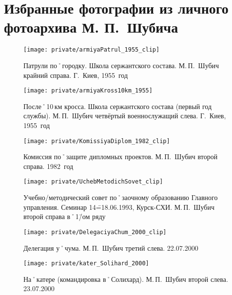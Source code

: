 ﻿\section[Избранные фотографии из фотоархива М. П.~Шубича]{Избранные фотографии из личного фотоархива М. П.~Шубича}

\makeatletter
\setlength{\@fptop}{0pt}
\makeatother

\begin{figure}[H]
\texttt{[image: private/armiyaPatrul\_1955\_clip]}
\caption{Патрули по˚городку. Школа сержантского состава. М.\,П.~Шубич крайний справа. Г.~Киев, 1955~год}
\label{fig:armiyaPatrul_1955}
\end{figure}

\begin{figure}[h]
\texttt{[image: private/armiyaKross10km\_1955]}
\caption{После˚10\,км кросса. Школа сержантского состава (первый год службы). М.\,П.~Шубич четвёртый военнослужащий слева. Г.~Киев, 1955~год}
\label{fig:armiyaKross10km_1955}
\end{figure}

\begin{figure}[h]
\texttt{[image: private/KomissiyaDiplom\_1982\_clip]}
\caption{Комиссия по˚защите дипломных проектов. М.\,П.~Шубич второй справа. 1982~год}
\label{fig:KomissiyaDiplom_1982}
\end{figure}

\begin{figure}[h]
\texttt{[image: private/UchebMetodichSovet\_clip]}
\caption{Учебно\-/методический совет по˚заочному образованию Главного управления. Семинар 14\==18.06.1993, Курск-СХИ. М.\,П.~Шубич второй справа в˚1\=/ом ряду}
\label{fig:UchebMetodichSovet}
\end{figure}

\begin{figure}[h]
\texttt{[image: private/DelegaciyaChum\_2000\_clip]}
\caption{Делегация у˚чума. М.\,П.~Шубич третий слева. 22.07.2000}
\label{fig:DelegaciyaChum_2000}
\end{figure}

\begin{figure}[h]
\texttt{[image: private/kater\_Solihard\_2000]}
\caption{На˚катере (командировка в˚Солихард). М.\,П.~Шубич второй слева. 23.07.2000}
\label{fig:kater_Solihard_2000}
\end{figure}


